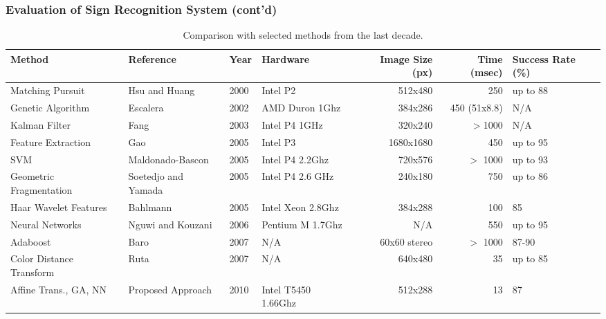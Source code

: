 \documentclass{beamer}
\begin{document}
\begin{frame}
	\frametitle{Evaluation of Sign Recognition System (cont'd)} 
	\begin{table}
	\centering
	\caption{Comparison with selected methods from the last decade.}
	\label{tab:perf}
	{\tiny
	\begin{tabular}{|p{14mm}|p{12mm}|l|l|r|r|p{10mm}|}
	\hline
	{\bf Method} & {\bf Reference} & {\bf Year} & {\bf Hardware} & {\bf Image Size (px)} & {\bf Time (msec)} & {\bf Success Rate (\%)} \\
	\hline
	Matching Pursuit &        Hsu and Huang &       2000 &   Intel P2 &    512x480 &       ~250 &   up to 88 \\
	\hline
	Genetic Algorithm &   Escalera &       2002 & AMD Duron 1Ghz &    384x286 & ~450 (51x8.8) &        N/A \\
	\hline
	Kalman Filter &       Fang &       2003 & Intel P4 1GHz &    320x240 &      $>$1000 &        N/A \\
	\hline
	Feature Extraction &        Gao &       2005 &   Intel P3 &  1680x1680 &       ~450 &   up to 95 \\
	\hline
	       SVM &     Maldonado-Bascon &       2005 & Intel P4 2.2Ghz &    720x576 &      $>$ 1000 &   up to 93 \\
	\hline
	Geometric Fragmentation &   Soetedjo and Yamada &       2005 & Intel P4 2.6 GHz &    240x180 &       ~750 &   up to 86 \\
	\hline
	Haar Wavelet Features &   Bahlmann &       2005 & Intel Xeon 2.8Ghz &    384x288 &       ~100 &         85 \\
	\hline
	Neural Networks &      Nguwi and Kouzani &       2006 & Pentium M 1.7Ghz &        N/A &       ~550 &   up to 95 \\
	\hline
	  Adaboost &       Baro &       2007 &        N/A & 60x60 stereo &      $>$ 1000 &      87-90 \\
	\hline
	Color Distance Transform &       Ruta &       2007 &        N/A &    640x480 &        ~35 &   up to 85 \\
	\hline
	Affine Trans., GA, NN & Proposed Approach &       2010 & Intel T5450 1.66Ghz &    512x288 &        ~13 &         87 \\
	\hline
	\end{tabular}  
	}
	\end{table}	
\end{frame}
\end{document}
